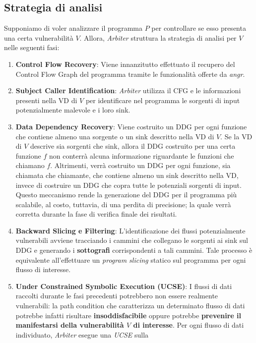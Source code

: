 \documentclass[../main.tex]{subfiles}
\begin{document}
\subsection{Strategia di analisi}
Supponiamo di voler analizzare il programma $P$ per controllare se esso presenta una certa vulnerabilità $V$.
Allora, \textit{Arbiter} struttura la strategia di analisi per $V$ nelle seguenti fasi:
\begin{enumerate}
    \item \textbf{Control Flow Recovery}: Viene innanzitutto effettuato il recupero del Control Flow Graph del programma tramite le funzionalità offerte da \textit{angr}.
    \item \textbf{Subject Caller Identification}: \textit{Arbiter} utilizza il CFG e le informazioni presenti nella VD di $V$ per identificare nel programma le sorgenti di input potenzialmente malevole e i loro sink. 
    \item \textbf{Data Dependency Recovery}: Viene costruito un DDG per ogni funzione che contiene almeno una sorgente o un sink descritto nella VD di $V$. 
    Se la VD di $V$ descrive sia sorgenti che sink, allora il DDG costruito per una certa funzione $f$ non conterrà alcuna informazione riguardante le funzioni che
    chiamano $f$. Altrimenti, verrà costruito un DDG per ogni funzione, sia chiamata che chiamante, che contiene almeno un sink descritto nella VD, invece di costruire un DDG che copra
    tutte le potenziali sorgenti di input. Questo meccanismo rende la generazione del DDG per il programma più scalabile, al costo, tuttavia, di una perdita di precisione; la quale verrà
    corretta durante la fase di verifica finale dei risultati.
    \item \textbf{Backward Slicing e Filtering}: L'identificazione dei flussi potenzialmente vulnerabili avviene tracciando i cammini che collegano le sorgenti ai sink sul DDG e generando i \textbf{sottografi}
    corrispondenti a tali cammini. Tale processo è equivalente all'effettuare un \textit{program slicing} statico sul programma per ogni flusso di interesse.
    \item \textbf{Under Constrained Symbolic Execution (UCSE)}: I flussi di dati raccolti durante le fasi precedenti potrebbero non essere realmente vulnerabili: la path condition che caratterizza un determinato flusso di dati
    potrebbe infatti risultare \textbf{insoddisfacibile} oppure potrebbe \textbf{prevenire il manifestarsi della vulnerabilità $V$ di interesse}. Per ogni flusso di dati individuato, \textit{Arbiter} esegue una \textit{UCSE} sulla

\end{enumerate}
\end{document}

